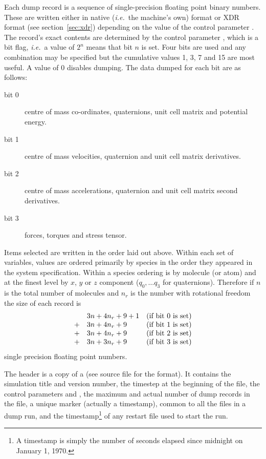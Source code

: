 \documentclass[a4paper,twoside]{report}
\newcommand{\ie}{\emph{i.e.}}
\begin{document}
Each dump record is a sequence of single-precision floating point
binary numbers.  These are written either in native (\ie\ the
machine's own) format or XDR format (see section~\ref{sec:xdr})
depending on the value of the control parameter .  The
record's exact contents are determined by the control parameter
, which is a bit flag, \ie\ a value of $2^{n}$
means that bit $n$ is set.  Four bits are used and any combination may
be specified but the cumulative values 1, 3, 7 and 15 are most
useful.  A value of 0 disables dumping. The data dumped for each bit
are as follows:
\begin{description}
\item[bit 0]    centre of mass co-ordinates, quaternions, unit cell matrix 
and potential energy.         
\item[bit 1]    centre of mass velocities, quaternion and unit cell
matrix derivatives.
\item[bit 2]    centre of mass accelerations, quaternion and unit cell
matrix second derivatives.
\item[bit 3]    forces, torques and stress tensor.
\end{description}
Items selected are written in the order laid out above.  Within each
set of variables, values are ordered primarily by species in the order
they appeared in the system specification.  Within a species ordering
is by molecule (or atom) and at the finest level by $x$, $y$ or $z$
component ($q_{0}, \ldots q_{3}$ for quaternions). Therefore if $n$ is
the total number of molecules and $n_{r}$ is the number with
rotational freedom the size of each record is
\begin{displaymath}
\begin{array}{cll}
   & 3n + 4n_{r} + 9 + 1 & \textnormal{(if bit 0 is set)} \\
 + & 3n + 4n_{r} + 9 & \textnormal{(if bit 1 is set)} \\
 + & 3n + 4n_{r} + 9 & \textnormal{(if bit 2 is set)} \\
 + & 3n + 3n_{r} + 9 & \textnormal{(if bit 3 is set)} \\
\end{array}
\end{displaymath}
single precision floating point numbers.

The header is a copy of a  (see
source file  for the format). It contains the simulation
title and version number, the timestep at the beginning of the file,
the control parameters  and , the
maximum and actual number of dump records in the file, a unique marker
(actually a timestamp), common to all the files in a dump run, and the
timestamp\footnote{A timestamp is simply the number of seconds elapsed
  since midnight on January 1, 1970.} of any restart file used to
start the run.
\end{document}
